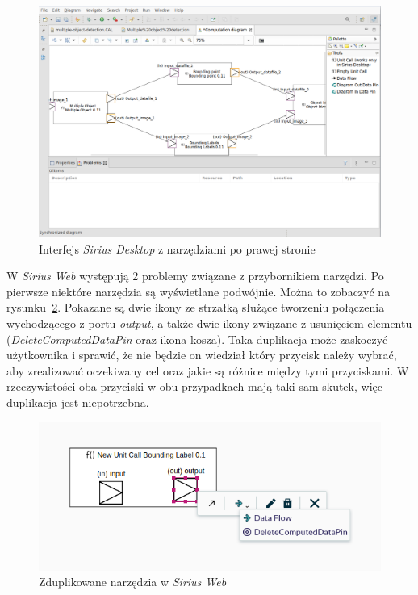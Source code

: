 \begin{figure}[!hb]
  \centering

  \includegraphics[width=0.95\linewidth]{./images/sirius-desktop-model-editor.png}
  \caption{Interfejs \emph{Sirius Desktop} z narzędziami po prawej
    stronie}\label{rys:sirius-desktop-model-editor-tools-right}
\end{figure}

W \emph{Sirius Web} występują 2 problemy związane z przybornikiem narzędzi. Po
pierwsze niektóre narzędzia są wyświetlane podwójnie. Można to zobaczyć na
rysunku~\ref{rys:sirius-web-duplicate-tools}. Pokazane są dwie ikony ze
strzałką służące tworzeniu połączenia wychodzącego z portu \emph{output}, a
także dwie ikony związane z usunięciem elementu (\emph{DeleteComputedDataPin}
oraz ikona kosza). Taka duplikacja może zaskoczyć użytkownika i sprawić, że nie
będzie on wiedział który przycisk należy wybrać, aby zrealizować oczekiwany cel
oraz jakie są różnice między tymi przyciskami. W rzeczywistości oba przyciski w
obu przypadkach mają taki sam skutek, więc duplikacja jest niepotrzebna.

\begin{figure}[!ht]
  \centering

  \includegraphics[width=0.95\linewidth]{./images/sirius-web-duplicate-tools.png}
  \caption{Zduplikowane narzędzia w \emph{Sirius
    Web}}\label{rys:sirius-web-duplicate-tools}
\end{figure}

